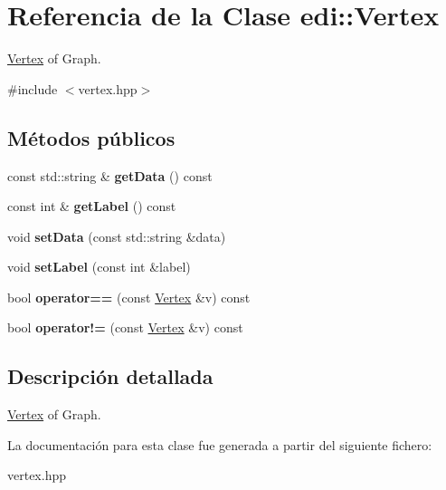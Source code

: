 \hypertarget{classedi_1_1Vertex}{}\section{Referencia de la Clase edi\+:\+:Vertex}
\label{classedi_1_1Vertex}


\hyperlink{classedi_1_1Vertex}{Vertex} of Graph.  




{\ttfamily \#include $<$vertex.\+hpp$>$}

\subsection*{Métodos públicos}
\begin{DoxyCompactItemize}
\item 
\hypertarget{classedi_1_1Vertex_a6d4f5bef9306c91ccfa6beeee12a9216}{}const std\+::string \& {\bfseries get\+Data} () const \label{classedi_1_1Vertex_a6d4f5bef9306c91ccfa6beeee12a9216}

\item 
\hypertarget{classedi_1_1Vertex_a032637afec6496f48284b463a23ce542}{}const int \& {\bfseries get\+Label} () const \label{classedi_1_1Vertex_a032637afec6496f48284b463a23ce542}

\item 
\hypertarget{classedi_1_1Vertex_ac54513ccf42164308239c493e7ef84d1}{}void {\bfseries set\+Data} (const std\+::string \&data)\label{classedi_1_1Vertex_ac54513ccf42164308239c493e7ef84d1}

\item 
\hypertarget{classedi_1_1Vertex_af87a2711c62dce91a06bc5d475cd250a}{}void {\bfseries set\+Label} (const int \&label)\label{classedi_1_1Vertex_af87a2711c62dce91a06bc5d475cd250a}

\item 
\hypertarget{classedi_1_1Vertex_ac525ae81d5200adcd873ce17c971e6e2}{}bool {\bfseries operator==} (const \hyperlink{classedi_1_1Vertex}{Vertex} \&v) const \label{classedi_1_1Vertex_ac525ae81d5200adcd873ce17c971e6e2}

\item 
\hypertarget{classedi_1_1Vertex_ac795e928ab825f5c36b36b9d5146d724}{}bool {\bfseries operator!=} (const \hyperlink{classedi_1_1Vertex}{Vertex} \&v) const \label{classedi_1_1Vertex_ac795e928ab825f5c36b36b9d5146d724}

\end{DoxyCompactItemize}


\subsection{Descripción detallada}
\hyperlink{classedi_1_1Vertex}{Vertex} of Graph. 

La documentación para esta clase fue generada a partir del siguiente fichero\+:\begin{DoxyCompactItemize}
\item 
vertex.\+hpp\end{DoxyCompactItemize}
